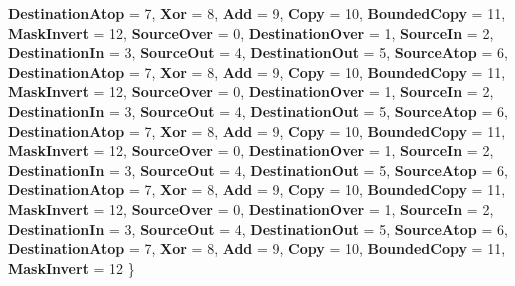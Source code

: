 \begin{DoxyCompactItemize}
{\bfseries Destination\+Atop} = 7, 
\newline
{\bfseries Xor} = 8, 
{\bfseries Add} = 9, 
{\bfseries Copy} = 10, 
{\bfseries Bounded\+Copy} = 11, 
\newline
{\bfseries Mask\+Invert} = 12, 
{\bfseries Source\+Over} = 0, 
{\bfseries Destination\+Over} = 1, 
{\bfseries Source\+In} = 2, 
\newline
{\bfseries Destination\+In} = 3, 
{\bfseries Source\+Out} = 4, 
{\bfseries Destination\+Out} = 5, 
{\bfseries Source\+Atop} = 6, 
\newline
{\bfseries Destination\+Atop} = 7, 
{\bfseries Xor} = 8, 
{\bfseries Add} = 9, 
{\bfseries Copy} = 10, 
\newline
{\bfseries Bounded\+Copy} = 11, 
{\bfseries Mask\+Invert} = 12, 
{\bfseries Source\+Over} = 0, 
{\bfseries Destination\+Over} = 1, 
\newline
{\bfseries Source\+In} = 2, 
{\bfseries Destination\+In} = 3, 
{\bfseries Source\+Out} = 4, 
{\bfseries Destination\+Out} = 5, 
\newline
{\bfseries Source\+Atop} = 6, 
{\bfseries Destination\+Atop} = 7, 
{\bfseries Xor} = 8, 
{\bfseries Add} = 9, 
\newline
{\bfseries Copy} = 10, 
{\bfseries Bounded\+Copy} = 11, 
{\bfseries Mask\+Invert} = 12, 
{\bfseries Source\+Over} = 0, 
\newline
{\bfseries Destination\+Over} = 1, 
{\bfseries Source\+In} = 2, 
{\bfseries Destination\+In} = 3, 
{\bfseries Source\+Out} = 4, 
\newline
{\bfseries Destination\+Out} = 5, 
{\bfseries Source\+Atop} = 6, 
{\bfseries Destination\+Atop} = 7, 
{\bfseries Xor} = 8, 
\newline
{\bfseries Add} = 9, 
{\bfseries Copy} = 10, 
{\bfseries Bounded\+Copy} = 11, 
{\bfseries Mask\+Invert} = 12, 
\newline
{\bfseries Source\+Over} = 0, 
{\bfseries Destination\+Over} = 1, 
{\bfseries Source\+In} = 2, 
{\bfseries Destination\+In} = 3, 
\newline
{\bfseries Source\+Out} = 4, 
{\bfseries Destination\+Out} = 5, 
{\bfseries Source\+Atop} = 6, 
{\bfseries Destination\+Atop} = 7, 
\newline
{\bfseries Xor} = 8, 
{\bfseries Add} = 9, 
{\bfseries Copy} = 10, 
{\bfseries Bounded\+Copy} = 11, 
\newline
{\bfseries Mask\+Invert} = 12
 \}
\item 
\mbox{\label{namespace_microsoft_1_1_graphics_1_1_canvas_a3ca0365f7ca6c805554d000be051da7c}} 

\end{DoxyCompactItemize}
